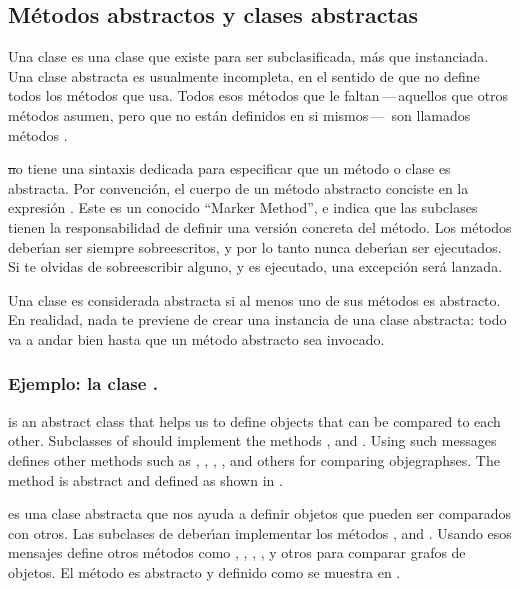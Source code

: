\documentclass[a4paper,10pt,twoside]{book}
\begin{document}
\subsection{M\'etodos abstractos y clases abstractas}

Una clase   es una clase que existe para ser subclasificada, m\'as que instanciada. 
Una clase abstracta es usualmente incompleta, en el sentido de que no define todos los m\'etodos que usa. 
Todos esos m\'etodos que le faltan\,---\,aquellos que otros m\'etodos asumen, pero que no est\'an definidos en si mismos\,---\, son llamados m\'etodos . 


\st no tiene una sintaxis dedicada para especificar que un m\'etodo o clase es abstracta. 
Por convenci\'on, el cuerpo de un m\'etodo abstracto conciste en la expresi\'on \mbox{.} 
Este es un conocido ``Marker Method'', e indica que las subclases tienen la responsabilidad de definir una versi\'on concreta del m\'etodo.
Los m\'etodos  deber\'\i{}an ser siempre sobreescritos, y por lo tanto nunca deber\'\i{}an ser ejecutados.
Si te olvidas de sobreescribir alguno, y es ejecutado, una excepci\'on ser\'a lanzada. 


Una clase es considerada abstracta si al menos uno de sus m\'etodos es abstracto.
En realidad, nada te previene de crear una instancia de una clase abstracta: todo va a andar bien hasta que un m\'etodo abstracto sea invocado. 


\subsubsection{Ejemplo: la clase .}


 is an abstract class that helps us to  define objects that can be compared to each other. Subclasses of  should implement the methods \ct{<}, \ct{=} and . Using such messages  defines other methods such as \ct{>}, \ct{>=}, \ct{<=}, ,   and others for comparing objegraphses. The method  is abstract and defined as shown in .


 es una clase abstracta que nos ayuda a definir objetos que pueden ser comparados con otros. Las subclases de  deber\'\i{}an implementar los m\'etodos \ct{<}, \ct{=} and . Usando esos mensajes  define otros m\'etodos como \ct{>}, \ct{>=}, \ct{<=}, ,   y otros para comparar grafos de objetos.  El m\'etodo    es abstracto y definido como se muestra en  .
\end{document}

